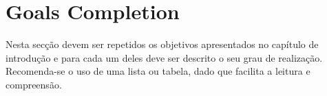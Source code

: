 \section{Goals Completion} %
\label{sec:goals_completion}

Nesta secção devem ser repetidos os objetivos apresentados no capítulo de introdução e para cada um deles deve ser descrito o seu grau de realização. Recomenda-se o uso de uma lista ou tabela, dado que facilita a leitura e compreensão.

